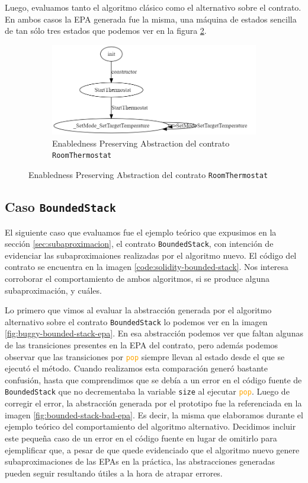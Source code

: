Luego, evaluamos tanto el algoritmo clásico como el alternativo sobre el contrato.
En ambos casos la EPA generada fue la misma, una máquina de estados sencilla de tan sólo tres estados que podemos ver en la figura \ref{fig:room-thermostat-epa}.

\begin{figure}
    \centering
    \begin{subfigure}{0.75\textwidth}
        \includegraphics[width=\textwidth]{figs/room-thermostate-epa.png}
        \caption{Enabledness Preserving Abstraction del contrato \texttt{RoomThermostat} }
        \label{fig:room-thermostat-epa}
    \end{subfigure}
\end{figure}

\subsection{Caso \texttt{BoundedStack}}
El siguiente caso que evaluamos fue el ejemplo teórico que expusimos en la sección \ref{sec:subaproximacion}, el contrato \texttt{BoundedStack}, con intención de evidenciar las subaproximaiones realizadas por el algoritmo nuevo.
El código del contrato se encuentra en la imagen \ref{code:solidity-bounded-stack}.
Nos interesa corroborar el comportamiento de ambos algoritmos, si se produce alguna subaproximación, y cuáles.

Lo primero que vimos al evaluar la abstracción generada por el algoritmo alternativo sobre el contrato \texttt{BoundedStack} lo podemos ver en la imagen \ref{fig:buggy-bounded-stack-epa}.
En esa abstracción  podemos ver que faltan algunas de las transiciones presentes en la EPA del contrato, pero además podemos observar que las transiciones por \textcolor{orange}{\texttt{pop}} siempre llevan al estado desde el que se ejecutó el método.
Cuando realizamos esta comparación generó bastante confusión, hasta que comprendimos que se debía a un error en el código fuente de \texttt{BoundedStack} que no decrementaba la variable \texttt{size} al ejecutar \textcolor{orange}{\texttt{pop}}.
Luego de corregir el error, la abstracción generada por el prototipo fue la referenciada en la imagen \ref{fig:bounded-stack-bad-epa}.
Es decir, la misma que elaboramos durante el ejemplo teórico del comportamiento del algoritmo alternativo.
Decidimos incluir este pequeña caso de un error en el código fuente en lugar de omitirlo para ejemplificar que, a pesar de que quede evidenciado que el algoritmo nuevo genere subaproximaciones de las EPAs en la práctica, las abstracciones generadas pueden seguir resultando útiles a la hora de atrapar errores.

